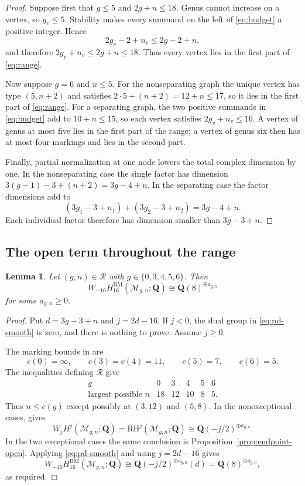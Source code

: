 \documentclass[12pt,reqno]{amsart}
\newcommand{\Q}{\mathbf{Q}}
\newcommand{\M}{\mathcal{M}}
\newcommand{\BM}{\mathrm{BM}}
\newcommand{\RH}{\mathrm{RH}}
\newtheorem{lemma}[theorem]{Lemma}
\theoremstyle{definition}
\theoremstyle{remark}
\begin{document}
\begin{proof}
Suppose first that $g\leq5$ and $2g+n\leq18$.  Genus cannot increase on a
vertex, so $g_v\leq5$.  Stability makes every summand on the left of
\eqref{eq:budget} a positive integer.  Hence
\[
  2g_v-2+n_v\leq2g-2+n,
\]
and therefore $2g_v+n_v\leq2g+n\leq18$.  Thus every vertex lies in the first
part of \eqref{eq:range}.

Now suppose $g=6$ and $n\leq5$.  For the nonseparating graph the unique
vertex has type $(5,n+2)$ and satisfies
$2\cdot5+(n+2)=12+n\leq17$, so it lies in the first part of
\eqref{eq:range}.  For a separating graph, the two positive summands in
\eqref{eq:budget} add to $10+n\leq15$, so each vertex satisfies
$2g_v+n_v\leq16$.  A vertex of genus at most five lies in the first part of
the range; a vertex of genus six then has at most four markings and lies in
the second part.

Finally, partial normalization at one node lowers the total complex
dimension by one.  In the nonseparating case the single factor has dimension
$3(g-1)-3+(n+2)=3g-4+n$.  In the separating case the factor dimensions add
to
\[
 (3g_1-3+n_1)+(3g_2-3+n_2)=3g-4+n.
\]
Each individual factor therefore has dimension smaller than
$3g-3+n$.
\end{proof}

\subsection{The open term throughout the range}

\begin{lemma}\label{lem:range-open}
Let $(g,n)\in\mathcal R$ with $g\in\{0,3,4,5,6\}$.  Then
\[
 W_{-16}H_{16}^{\BM}(\M_{g,n};\Q)
 \cong\Q(8)^{\oplus a_{g,n}}
\]
for some $a_{g,n}\geq0$.
\end{lemma}

\begin{proof}
Put $d=3g-3+n$ and $j=2d-16$.  If $j<0$, the dual group in
\eqref{eq:pd-smooth} is zero, and there is nothing to prove.  Assume
$j\geq0$.

The marking bounds in \cite[Table~1]{CLP} are
\[
 c(0)=\infty,\qquad c(3)=c(4)=11,
 \qquad c(5)=7,\qquad c(6)=5.
\]
The inequalities defining $\mathcal R$ give
\[
 \begin{array}{c|ccccc}
 g&0&3&4&5&6\\ \hline
 \text{largest possible }n&18&12&10&8&5.
 \end{array}
\]
Thus $n\leq c(g)$ except possibly at $(3,12)$ and $(5,8)$.  In the
nonexceptional cases, \cite[Proposition~4.5]{CLP} gives
\[
 W_jH^j(\M_{g,n};\Q)=\RH^j(\M_{g,n};\Q)
 \cong\Q(-j/2)^{\oplus a_{g,n}}.
\]
In the two exceptional cases the same conclusion is
Proposition~\ref{prop:endpoint-open}.  Applying \eqref{eq:pd-smooth} and
using $j=2d-16$ gives
\[
 W_{-16}H_{16}^{\BM}(\M_{g,n};\Q)
 \cong\Q(-j/2)^{\oplus a_{g,n}}(d)
 =\Q(8)^{\oplus a_{g,n}},
\]
as required.
\end{proof}
\end{document}
